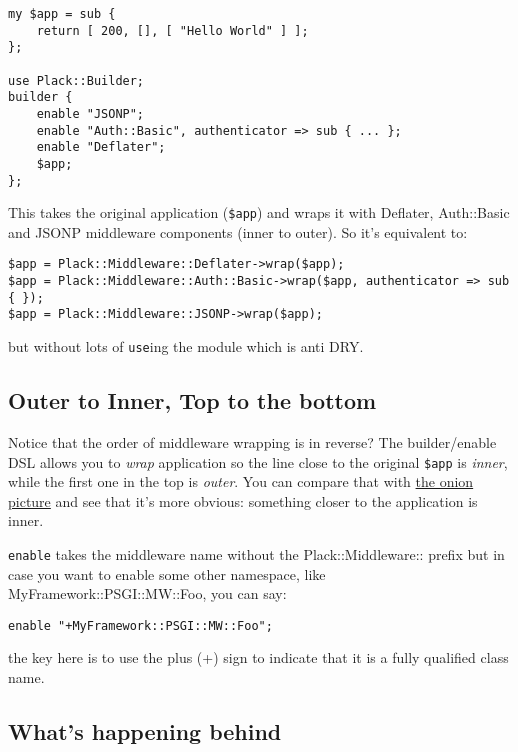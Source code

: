 \begin{lstlisting}
my $app = sub { 
    return [ 200, [], [ "Hello World" ] ];
};

use Plack::Builder;
builder {
    enable "JSONP";
    enable "Auth::Basic", authenticator => sub { ... };
    enable "Deflater";
    $app;
};
\end{lstlisting}

This takes the original application (\lstinline!$app!) and wraps it with
Deflater, Auth::Basic and JSONP middleware components (inner to outer).
So it's equivalent to:

\begin{lstlisting}
$app = Plack::Middleware::Deflater->wrap($app);
$app = Plack::Middleware::Auth::Basic->wrap($app, authenticator => sub { });
$app = Plack::Middleware::JSONP->wrap($app);
\end{lstlisting}

but without lots of \lstinline!use!ing the module which is anti DRY.

\subsection{Outer to Inner, Top to the
bottom}\label{outer-to-inner-top-to-the-bottom}

Notice that the order of middleware wrapping is in reverse? The
builder/enable DSL allows you to \emph{wrap} application so the line
close to the original \lstinline!$app! is \emph{inner}, while the first
one in the top is \emph{outer}. You can compare that with
\href{http://pylonshq.com/docs/en/0.9.7/_images/pylons_as_onion.png}{the
onion picture} and see that it's more obvious: something closer to the
application is inner.

\lstinline!enable! takes the middleware name without the
Plack::Middleware:: prefix but in case you want to enable some other
namespace, like MyFramework::PSGI::MW::Foo, you can say:

\begin{lstlisting}
enable "+MyFramework::PSGI::MW::Foo";
\end{lstlisting}

the key here is to use the plus (+) sign to indicate that it is a fully
qualified class name.

\subsection{What's happening behind}\label{whats-happening-behind}

